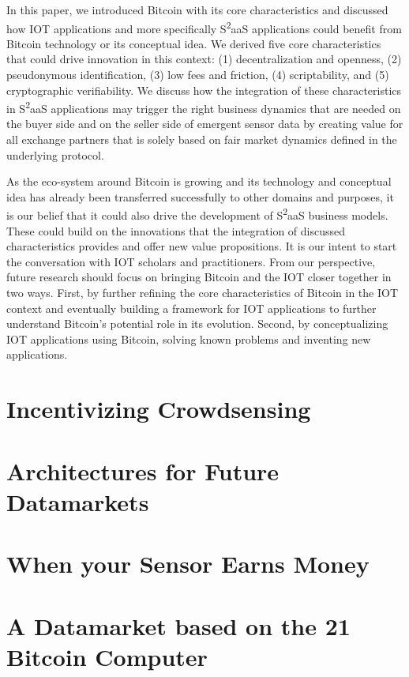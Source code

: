 In this paper, we introduced Bitcoin with its core characteristics and discussed how IOT applications and more specifically S\textsuperscript{2}aaS applications could benefit from Bitcoin technology or its conceptual idea. We derived five core characteristics that could drive innovation in this context: (1) decentralization and openness, (2) pseudonymous identification, (3) low fees and friction, (4) scriptability, and (5) cryptographic verifiability. We discuss how the integration of these characteristics in S\textsuperscript{2}aaS applications may trigger the right business dynamics that are needed on the buyer side and on the seller side of emergent sensor data by creating value for all exchange partners that is solely based on fair market dynamics defined in the underlying protocol. 

As the eco-system around Bitcoin is growing and its technology and conceptual idea has already been transferred successfully to other domains and purposes, it is our belief that it could also drive the development of S\textsuperscript{2}aaS business models. These could build on the innovations that the integration of discussed characteristics provides and offer new value propositions. It is our intent to start the conversation with IOT scholars and practitioners. From our perspective, future research should focus on bringing Bitcoin and the IOT closer together in two ways. First, by further refining the core characteristics of Bitcoin in the IOT context and eventually building a framework for IOT applications to further understand Bitcoin's potential role in its evolution. Second, by conceptualizing IOT applications using Bitcoin, solving known problems and inventing new applications.

\section{Incentivizing Crowdsensing}

\section{Architectures for Future Datamarkets}

\section{When your Sensor Earns Money}


\section{A Datamarket based on the 21 Bitcoin Computer}
